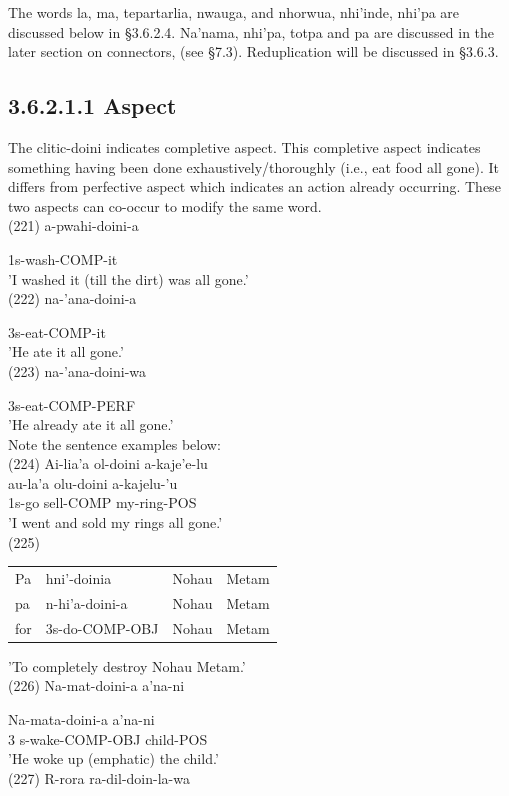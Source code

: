 \documentclass[10pt]{article}
\begin{document}
The words la, ma, tepartarlia, nwauga, and nhorwua, nhi'inde, nhi'pa are discussed below in §3.6.2.4. Na'nama, nhi'pa, totpa and pa are discussed in the later section on connectors, (see §7.3). Reduplication will be discussed in §3.6.3.

\subsection*{3.6.2.1.1 Aspect}
The clitic-doini indicates completive aspect. This completive aspect indicates something having been done exhaustively/thoroughly (i.e., eat food all gone). It differs from perfective aspect which indicates an action already occurring. These two aspects can co-occur to modify the same word.\\
(221) a-pwahi-doini-a

1s-wash-COMP-it\\
'I washed it (till the dirt) was all gone.'\\
(222) na-'ana-doini-a

3s-eat-COMP-it\\
'He ate it all gone.'\\
(223) na-'ana-doini-wa

3s-eat-COMP-PERF\\
'He already ate it all gone.'\\
Note the sentence examples below:\\
(224) Ai-lia'a ol-doini a-kaje'e-lu\\
au-la'a olu-doini a-kajelu-'u\\
1s-go sell-COMP my-ring-POS\\
'I went and sold my rings all gone.'\\
(225)

\begin{center}
\begin{tabular}{llll}
Pa & hni'-doinia & Nohau & Metam \\
pa & n-hi'a-doini-a & Nohau & Metam \\
for & 3s-do-COMP-OBJ & Nohau & Metam \\
\end{tabular}
\end{center}

'To completely destroy Nohau Metam.'\\
(226) Na-mat-doini-a a'na-ni

Na-mata-doini-a a'na-ni\\
3 s-wake-COMP-OBJ child-POS\\
'He woke up (emphatic) the child.'\\
(227) R-rora ra-dil-doin-la-wa
\end{document}
